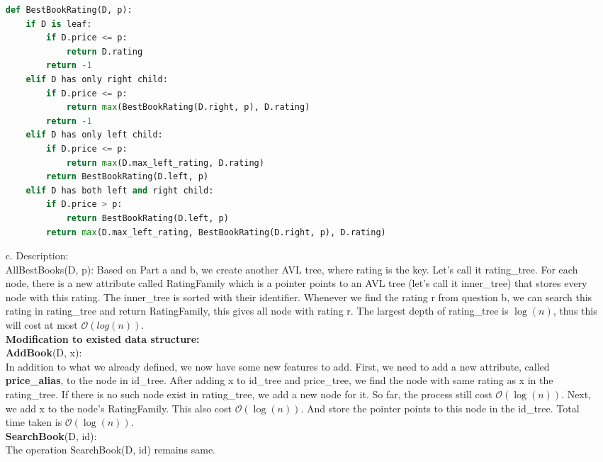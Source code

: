 \documentclass[10pt]{article}
\begin{document}
\begin{enumerate}
\begin{lstlisting}[language=Python]
def BestBookRating(D, p):
	if D is leaf:
		if D.price <= p:
			return D.rating
		return -1
	elif D has only right child:
		if D.price <= p:
			return max(BestBookRating(D.right, p), D.rating)
		return -1
	elif D has only left child:
		if D.price <= p:
			return max(D.max_left_rating, D.rating)
		return BestBookRating(D.left, p)
	elif D has both left and right child:
		if D.price > p:
			return BestBookRating(D.left, p)
		return max(D.max_left_rating, BestBookRating(D.right, p), D.rating)
\end{lstlisting}


\item[c.]Description:\\
AllBestBooks(D, p): Based on Part a and b, we create another AVL tree, where rating is the key. Let's call it rating\_tree. For each node, there is a new attribute called RatingFamily which is a pointer points to an AVL tree (let's call it inner\_tree) that stores every node with this rating. The inner\_tree is sorted with their identifier. Whenever we find the rating r from question b, we can search this rating in rating\_tree and return RatingFamily, this gives all node with rating r. The largest depth of rating\_tree is $\log (n)$, thus this will cost at most $\mathcal{O}(log (n))$. \\
\textbf{Modification to existed data structure:}\\
\textbf{AddBook}(D, x):\\
In addition to what we already defined, we now have some new features to add. First, we need to add a new attribute, called \textbf{price\_alias}, to the node in id\_tree. After adding x to id\_tree and price\_tree, we find the node with same rating as x in the rating\_tree. If there is no such node exist in rating\_tree, we add a new node for it. So far, the process still cost $\mathcal{O}(\log (n))$. Next, we add x to the node's RatingFamily. This also cost $\mathcal{O}(\log(n))$. And store the pointer points to this node in the id\_tree. Total time taken is $\mathcal{O}(\log(n))$.\\
\textbf{SearchBook}(D, id):\\
The operation SearchBook(D, id) remains same.\\


\end{enumerate}
\end{document}
